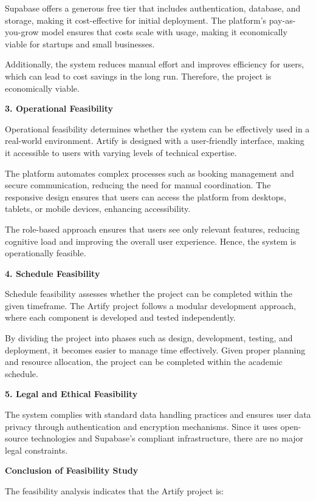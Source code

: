 \documentclass[12pt,a4paper]{report}
\begin{document}
Supabase offers a generous free tier that includes authentication, database, and storage, making it cost-effective for initial deployment. The platform's pay-as-you-grow model ensures that costs scale with usage, making it economically viable for startups and small businesses.

Additionally, the system reduces manual effort and improves efficiency for users, which can lead to cost savings in the long run. Therefore, the project is economically viable.

\textbf{3. Operational Feasibility}

Operational feasibility determines whether the system can be effectively used in a real-world environment. Artify is designed with a user-friendly interface, making it accessible to users with varying levels of technical expertise.

The platform automates complex processes such as booking management and secure communication, reducing the need for manual coordination. The responsive design ensures that users can access the platform from desktops, tablets, or mobile devices, enhancing accessibility.

The role-based approach ensures that users see only relevant features, reducing cognitive load and improving the overall user experience. Hence, the system is operationally feasible.

\textbf{4. Schedule Feasibility}

Schedule feasibility assesses whether the project can be completed within the given timeframe. The Artify project follows a modular development approach, where each component is developed and tested independently.

By dividing the project into phases such as design, development, testing, and deployment, it becomes easier to manage time effectively. Given proper planning and resource allocation, the project can be completed within the academic schedule.

\textbf{5. Legal and Ethical Feasibility}

The system complies with standard data handling practices and ensures user data privacy through authentication and encryption mechanisms. Since it uses open-source technologies and Supabase's compliant infrastructure, there are no major legal constraints.

\textbf{Conclusion of Feasibility Study}

The feasibility analysis indicates that the Artify project is:
\end{document}
